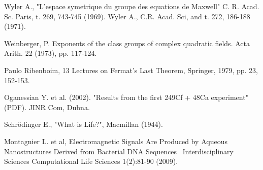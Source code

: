 \documentclass[a4paper,9pt]{article}
\begin{document}
\begin{thebibliography}{99}


 Wyler A., "L'espace symetrique du groupe des equations de Maxwell" C. R. Acad. Sc. Paris, t. 269, 743-745 (1969). Wyler A., C.R. Acad. Sci, and t. 272, 186-188 (1971).













 Weinberger, P. Exponents of the class groups of complex quadratic fields. Acta Arith. 22 (1973), pp. 117-124.



 Paulo Ribenboim, 13 Lectures on Fermat's Last Theorem, Springer, 1979, pp. 23, 152-153.

 Oganessian Y. et al. (2002). "Results from the first 249Cf + 48Ca experiment" (PDF). JINR Com, Dubna.

 Schrödinger E., "What is Life?", Macmillan (1944). 

 Montagnier L. et al, Electromagnetic Signals Are Produced by Aqueous Nanostructures Derived from Bacterial DNA Sequences  Interdisciplinary Sciences Computational Life Sciences 1(2):81-90 (2009).

 




\end{thebibliography}
\end{document}
